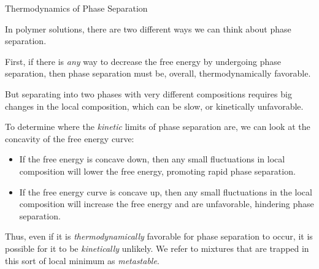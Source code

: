 \begin{activity}{Thermodynamics of Phase Separation}
\begin{ctqs}
			\begin{solution}[1.5in]\end{solution}
			
\end{ctqs}

\begin{infobox}
	In polymer solutions, there are two different ways we can think about phase separation.
	
	First, if there is \emph{any} way to decrease the free energy by undergoing phase separation, then phase separation must be, overall, thermodynamically favorable.
	
	But separating into two phases with very different compositions requires big changes in the local composition, which can be slow, or kinetically unfavorable.
	
	To determine where the \emph{kinetic} limits of phase separation are, we can look at the concavity of the free energy curve:
	\begin{itemize}
		\item If the free energy is concave down, then any small fluctuations in local composition will lower the free energy, promoting rapid phase separation.
		\item If the free energy curve is concave up, then any small fluctuations in the local composition will increase the free energy and are unfavorable, hindering phase separation.
	\end{itemize}
	
	Thus, even if it is \emph{thermodynamically} favorable for phase separation to occur, it is possible for it to be \emph{kinetically} unlikely.  We refer to mixtures that are trapped in this sort of local minimum as \emph{metastable}.
	
\end{infobox}


\end{activity}
